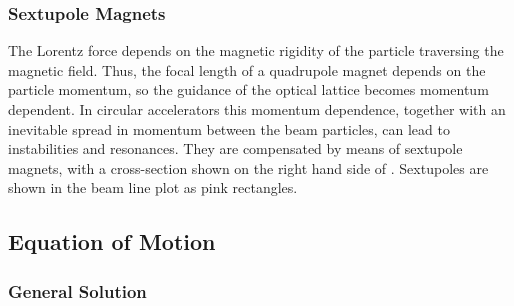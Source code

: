 \subsubsection{Sextupole Magnets}

The Lorentz force depends on the magnetic rigidity of the particle traversing the magnetic field. Thus, the focal length of a quadrupole magnet depends on the particle momentum, so the guidance of the optical lattice becomes momentum dependent. In circular accelerators this momentum dependence, together with an inevitable spread in momentum between the beam particles, can lead to instabilities and resonances. They are compensated by means of sextupole magnets, with a cross-section shown on the right hand side of . Sextupoles are shown in the beam line plot as pink rectangles.


\subsection{Equation of Motion}\label{chap:eqmotion}
\subsubsection{General Solution}

